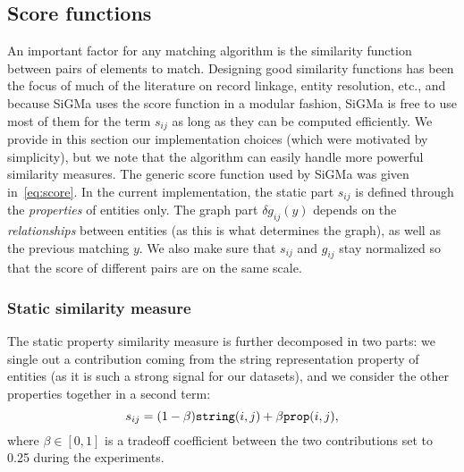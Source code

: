 \documentclass{sig-alternate}
\renewcommand{\tt}[1]{\texttt{#1}}
\begin{document}
%

\subsection{Score functions} \label{sec:score}
An important factor for any matching algorithm is the similarity function between pairs of elements to match. Designing good similarity functions has been the focus of much of the literature on record linkage, entity resolution, etc., and because \textsf{SiGMa} uses the score function in a modular fashion, \textsf{SiGMa} is free to use most of them for the term $s_{ij}$ as long as they can be computed efficiently. We provide in this section our implementation choices (which were motivated by simplicity), but we note that the algorithm can easily handle more powerful similarity measures. The generic score function used by \textsf{SiGMa} was given in~\eqref{eq:score}. In the current implementation, the static part $s_{ij}$ is defined through the \emph{properties} of entities only. The graph part $\delta g_{ij}(y)$ depends on the \emph{relationships} between entities (as this is what determines the graph), as well as the previous matching $y$. We also make sure that $s_{ij}$ and $g_{ij}$ stay normalized so that the score of different pairs are on the same scale.

\subsubsection{Static  similarity measure}
The static property similarity measure is further decomposed in two parts: we single out a contribution coming from the string representation property of entities (as it is such a strong signal for our datasets), and we consider the other properties together in a second term: %
\begin{equation} \label{eq:static}
s_{ij} = (1-\beta) \textrm{\tt{string}}(i,j) + \beta \textrm{\tt{prop}}(i,j),
\end{equation}
where $\beta \in [0,1]$ is a tradeoff coefficient between the two contributions set to 0.25 during the experiments.
%

%
\end{document}
